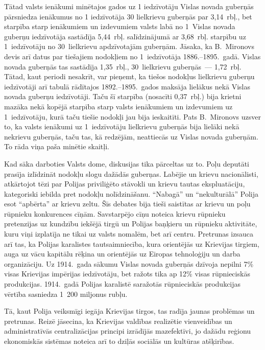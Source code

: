 \documentclass[twoside,a5paper,12pt,fleqn,openany]{extbook}
\begin{document}
Tātad valsts ienākumi minētajos gados uz 1 iedzīvotāju Vislas novada guberņās pārsniedza ienākumus no 1 iedzīvotāja 30 lielkrievu guberņās par 3,14~rbļ., bet starpība starp ienākumiem un izdevumiem valsts labā no 1~Vislas novada guberņu iedzīvotāja sastādīja 5,44~rbļ. salīdzinājumā ar 3,68~rbļ. starpību uz 1~iedzīvotāju no 30~lielkrievu apdzīvotajām guberņām. Jāsaka, ka B.~Mironovs devis arī datus par tiešajiem nodokļiem no 1~iedzīvotāja 1886.--1895.~gadā. Vislas novada guberņās tas sastādīja 1,35~rbļ., 30~lielkrievu guberņās~--- 1,72~rbļ. Tātad, kaut periodi nesakrīt, var pieņemt, ka tiešos nodokļus lielkrievu guberņu iedzīvotāji arī tabulā rādītajos 1892.--1895.~gados maksāja lielākus nekā Vislas novada guberņu iedzīvotāji. Taču šī starpība (nosacīti 0,37~rbļ.) bija krietni mazāka nekā kopējā starpība starp valsts ienākumiem un izdevumiem uz 1~iedzīvotāju, kurā taču tiešie nodokļi jau bija ieskaitīti. Pats B.~Mironovs uzsver to, ka valsts ienākumi uz 1~iedzīvotāju lielkrievu guberņās bija lielāki nekā nekrievu guberņās, taču tas, kā redzējām, neattiecās uz Vislas novada guberņām. To rāda viņa paša minētie skaitļi.

Kad sāka darboties Valsts dome, diskusijas tika pārceltas uz to. Poļu deputāti prasīja izlīdzināt nodokļu slogu dažādās guberņas. Labējie un krievu nacionālisti, atkārtojot tēzi par Polijas priviliģēto stāvokli un krievu tautas ekspluatāciju, kategoriski iebilda pret nodokļu nolīdzināšanu. ``Nabagā'' un ``nekulturālā'' Polija esot ``apbērta'' ar krievu zeltu. Šīs debates bija tieši saistītas ar krievu un poļu rūpnieku konkurences cīņām. Savstarpējo cīņu noteica krievu rūpnieku pretenzijas uz kundzību iekšējā tirgū un Polijas baņķieru un rūpnieku aktivitāte, kuru viņi izplatīja ne tikai uz valsts nomalēm, bet arī centru. Pretrunas izsauca arī tas, ka Polijas karalistes tautsaimniecība, kura orientējās uz Krievijas tirgiem, auga uz vācu kapitālu rēķina un orientējās uz Eiropas tehnoloģiju un darba organizāciju. Uz 1914.~gada sākumu Vislas novada guberņās dzīvoja nepilni 7\% visas Krievijas impērijas iedzīvotāju, bet ražots tika ap 12\% visas rūpnieciskās produkcijas. 1914.~gadā Polijas karalistē saražotās rūpnieciskās produkcijas vērtība sasniedza 1~200 miljonus rubļu.

Tā, kaut Polija veiksmīgi iegāja Krievijas tirgos, tas radīja jaunas problēmas un pretrunas. Reizē jāsecina, ka Krievijas valdības realizētie vienveidības un administratīvās centralizācijas principi izrādījās mazefektīvi, jo dažādu reģionu ekonomiskās sistēmas noteica arī to dziļās sociālās un kultūras atšķirības.
\end{document}

